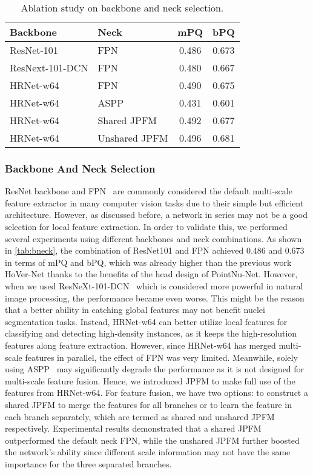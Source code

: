 \documentclass[lettersize,journal]{IEEEtran}
\begin{document}
\begin{table}[t]
\centering
\caption{Ablation study on backbone and neck selection.}
\begin{tabular}{llcc}
\toprule
Backbone & Neck & mPQ &bPQ \\\midrule
ResNet-101 &FPN & 0.486  & 0.673 \\
ResNext-101-DCN &FPN &0.480   & 0.667 \\
HRNet-w64 & FPN&0.490 &0.675  \\
HRNet-w64 & ASPP  &0.431&0.601\\
HRNet-w64 & Shared JPFM& 0.492 & 0.677 \\
HRNet-w64 & Unshared JPFM& 0.496 & 0.681 \\\bottomrule
\end{tabular}
\label{tab:bneck}
\end{table}

\subsubsection{Backbone And Neck Selection}
\label{sec:neck}
ResNet backbone and FPN~\cite{fpn} are commonly considered the default multi-scale feature extractor in many computer vision tasks due to their simple but efficient architecture. However, as discussed before, a network in series may not be a good selection for local feature extraction. In order to validate this, we performed several experiments using different backbones and neck combinations. As shown in \autoref{tab:bneck}, the combination of ResNet101 and FPN achieved 0.486 and 0.673 in terms of mPQ and bPQ, which was already higher than the previous work HoVer-Net thanks to the benefits of the head design of PointNu-Net. However, when we used ResNeXt-101-DCN~\cite{zhu2019deformable} which is considered more powerful in natural image processing, the performance became even worse. This might be the reason that a better ability in catching global features may not benefit nuclei segmentation tasks. Instead, HRNet-w64 can better utilize local features for classifying and detecting high-density instances, as it keeps the high-resolution features along feature extraction. However, since HRNet-w64 has merged multi-scale features in parallel, the effect of FPN was very limited. Meanwhile, solely using ASPP~\cite{chen2017deeplab} may significantly degrade the performance as it is not designed for multi-scale feature fusion. Hence, we introduced JPFM to make full use of the features from HRNet-w64. For feature fusion, we have two options: to construct a shared JPFM to merge the features for all branches or to learn the feature in each branch separately, which are termed as shared and unshared JPFM respectively. Experimental results demonstrated that a shared JPFM outperformed the default neck FPN, while the unshared JPFM further boosted the network’s ability since different scale information may not have the same importance for the three separated branches. 
\end{document}
